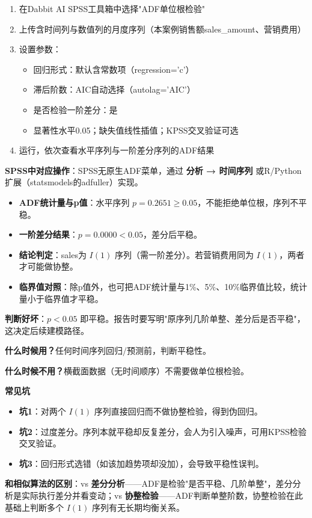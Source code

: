 \begin{algosposs}
\begin{enumerate}
    \item 在Dabbit AI SPSS工具箱中选择"ADF单位根检验"
    \item 上传含时间列与数值列的月度序列（本案例销售额sales\_amount、营销费用）
    \item 设置参数：
    \begin{itemize}
        \item 回归形式：默认含常数项（regression='c'）
        \item 滞后阶数：AIC自动选择（autolag='AIC'）
        \item 是否检验一阶差分：是
        \item 显著性水平0.05；缺失值线性插值；KPSS交叉验证可选
    \end{itemize}
    \item 运行，依次查看水平序列与一阶差分序列的ADF结果
\end{enumerate}

\textbf{SPSS中对应操作}：SPSS无原生ADF菜单，通过 \textbf{分析 → 时间序列} 或R/Python扩展（statsmodels的adfuller）实现。
\end{algosposs}

\begin{algoresult}
\begin{itemize}
    \item \textbf{ADF统计量与p值}：水平序列 $p=0.2651\geq0.05$，不能拒绝单位根，序列不平稳。
    \item \textbf{一阶差分结果}：$p=0.0000<0.05$，差分后平稳。
    \item \textbf{结论判定}：sales为 $I(1)$ 序列（需一阶差分）。若营销费用同为 $I(1)$，两者才可能做协整。
    \item \textbf{临界值对照}：除p值外，也可把ADF统计量与1\%、5\%、10\%临界值比较，统计量小于临界值才平稳。
\end{itemize}

\textbf{判断好坏}：$p<0.05$ 即平稳。报告时要写明"原序列几阶单整、差分后是否平稳"，这决定后续建模路径。
\end{algoresult}

\begin{algonotes}
\textbf{什么时候用？}任何时间序列回归/预测前，判断平稳性。

\textbf{什么时候不用？}横截面数据（无时间顺序）不需要做单位根检验。

\textbf{常见坑}
\begin{itemize}
    \item \textbf{坑1}：对两个 $I(1)$ 序列直接回归而不做协整检验，得到伪回归。
    \item \textbf{坑2}：过度差分。序列本就平稳却反复差分，会人为引入噪声，可用KPSS检验交叉验证。
    \item \textbf{坑3}：回归形式选错（如该加趋势项却没加），会导致平稳性误判。
\end{itemize}

\textbf{和相似算法的区别}：vs \textbf{差分分析}——ADF是检验"是否平稳、几阶单整"，差分分析是实际执行差分并看变动；vs \textbf{协整检验}——ADF判断单整阶数，协整检验在此基础上判断多个 $I(1)$ 序列有无长期均衡关系。
\end{algonotes}

